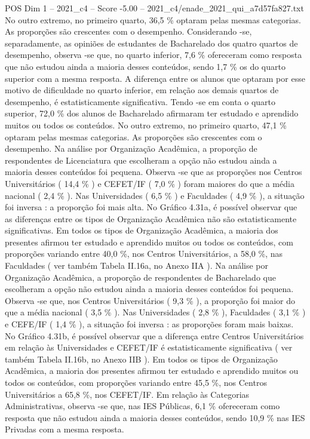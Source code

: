 \begin{textsample}{POS Dim 1 – 2021\_c4 – Score -5.00 – 2021\_c4/enade\_2021\_qui\_a7d57fa827.txt}
No outro extremo, no primeiro quarto, 36,5 \% optaram pelas mesmas categorias.
As proporções são crescentes com o desempenho.
Considerando -se, separadamente, as opiniões de estudantes de Bacharelado dos quatro quartos de desempenho, observa -se que, no quarto inferior, 7,6 \% ofereceram como resposta que não estudou ainda a maioria desses conteúdos, sendo 1,7 \% os do quarto superior com a mesma resposta.
A diferença entre os alunos que optaram por esse motivo de dificuldade no quarto inferior, em relação aos demais quartos de desempenho, é estatisticamente significativa.
Tendo -se em conta o quarto superior, 72,0 \% dos alunos de Bacharelado afirmaram ter estudado e aprendido muitos ou todos os conteúdos.
No outro extremo, no primeiro quarto, 47,1 \% optaram pelas mesmas categorias.
As proporções são crescentes com o desempenho.
Na análise por Organização Acadêmica, a proporção de respondentes de Licenciatura que escolheram a opção não estudou ainda a maioria desses conteúdos foi pequena.
Observa -se que as proporções nos Centros Universitários ( 14,4 \% ) e CEFET/IF ( 7,0 \% ) foram maiores do que a média nacional ( 2,4 \% ).
Nas Universidades ( 6,5 \% ) e Faculdades ( 4,9 \% ), a situação foi inversa : a proporção foi mais alta.
No Gráfico 4.31a, é possível observar que as diferenças entre os tipos de Organização Acadêmica não são estatisticamente significativas.
Em todos os tipos de Organização Acadêmica, a maioria dos presentes afirmou ter estudado e aprendido muitos ou todos os conteúdos, com proporções variando entre 40,0 \%, nos Centros Universitários, a 58,0 \%, nas Faculdades ( ver também Tabela II.16a, no Anexo IIA ).
Na análise por Organização Acadêmica, a proporção de respondentes de Bacharelado que escolheram a opção não estudou ainda a maioria desses conteúdos foi pequena.
Observa -se que, nos Centros Universitários ( 9,3 \% ), a proporção foi maior do que a média nacional ( 3,5 \% ).
Nas Universidades ( 2,8 \% ), Faculdades ( 3,1 \% ) e CEFE/IF ( 1,4 \% ), a situação foi inversa : as proporções foram mais baixas.
No Gráfico 4.31b, é possível observar que a diferença entre Centros Universitários em relação às Universidades e CEFET/IF é estatisticamente significativa ( ver também Tabela II.16b, no Anexo IIB ).
Em todos os tipos de Organização Acadêmica, a maioria dos presentes afirmou ter estudado e aprendido muitos ou todos os conteúdos, com proporções variando entre 45,5 \%, nos Centros Universitários a 65,8 \%, nos CEFET/IF.
Em relação às Categorias Administrativas, observa -se que, nas IES Públicas, 6,1 \% ofereceram como resposta que não estudou ainda a maioria desses conteúdos, sendo 10,9 \% nas IES Privadas com a mesma resposta.

\end{textsample}
